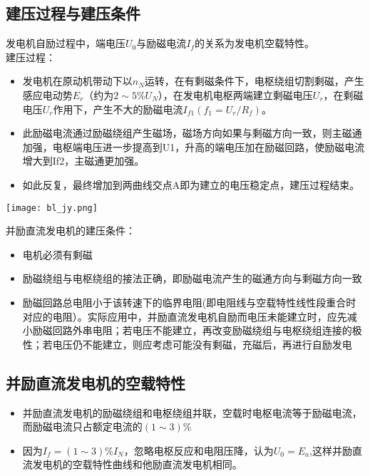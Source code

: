 \documentclass[blue]{elegantnote}
\begin{document}
\subsection{建压过程与建压条件}
发电机自励过程中，端电压$U_0$与励磁电流$I_f$的关系为发电机空载特性。 \\
建压过程：
\begin{itemize}
	\item 发电机在原动机带动下以$n_N$运转，在有剩磁条件下，电枢绕组切割剩磁，产生感应电动势$E_r$（约为$2\sim5\%U_N$），在发电机电枢两端建立剩磁电压$U_r$，在剩磁电压$U_r$作用下，产生不大的励磁电流$I_{f1}(f_1=U_r/R_f)$。
	\item 此励磁电流通过励磁绕组产生磁场，磁场方向如果与剩磁方向一致，则主磁通加强，电枢端电压进一步提高到U1，升高的端电压加在励磁回路，使励磁电流增大到If2，主磁通更加强。
	\item 如此反复，最终增加到两曲线交点A即为建立的电压稳定点，建压过程结束。 
\end{itemize}
\begin{center}
	\texttt{[image: bl\_jy.png]}
\end{center}
\begin{note}
	并励直流发电机的建压条件：
	\begin{itemize}
		\item 电机必须有剩磁
		\item 励磁绕组与电枢绕组的接法正确，即励磁电流产生的磁通方向与剩磁方向一致
		\item 励磁回路总电阻小于该转速下的临界电阻(即电阻线与空载特性线性段重合时对应的电阻）。实际应用中，并励直流发电机自励而电压未能建立时，应先减小励磁回路外串电阻；若电压不能建立，再改变励磁绕组与电枢绕组连接的极性；若电压仍不能建立，则应考虑可能没有剩磁，充磁后，再进行自励发电
	\end{itemize}
\end{note}
\subsection{并励直流发电机的空载特性}
\begin{itemize}
	\item 并励直流发电机的励磁绕组和电枢绕组并联，空载时电枢电流等于励磁电流，而励磁电流只占额定电流的$(1\sim3)\%$
	\item 因为$I_f=(1\sim3)\%I_N$，忽略电枢反应和电阻压降，认为$ U_0=E_a$,这样并励直流发电机的空载特性曲线和他励直流发电机相同。
\end{itemize}
\end{document}
